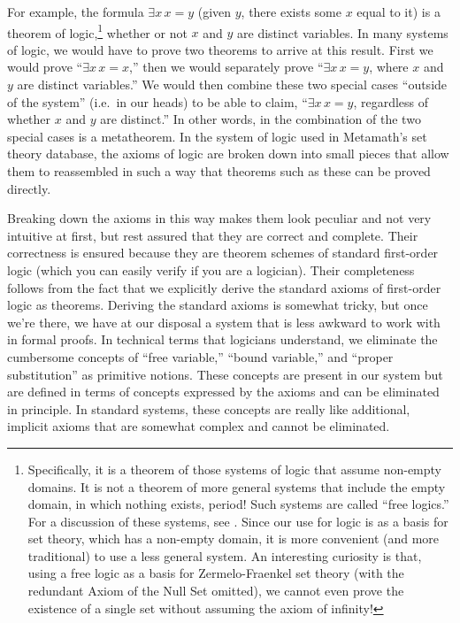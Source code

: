 For example, the formula $\exists x \, x = y $ (given $y$, there exists some
$x$ equal to it) is a theorem of logic,\footnote{Specifically, it is a theorem
of those systems of logic that assume non-empty domains.  It is not a theorem
of more general systems that include the empty domain, in
which nothing exists, period!  Such systems are called ``free
logics.'' For a discussion of these systems, see
\cite{Leblanc}.  Since our use for logic is as a basis
for set theory, which has a non-empty domain, it is more convenient (and more
traditional) to use a less general system.  An interesting curiosity is that,
using a free logic as a basis for Zermelo-Fraenkel set
theory (with the redundant Axiom of the
Null Set omitted), we cannot even prove the
existence of a single set without assuming the axiom of infinity!} whether or not $x$ and $y$ are distinct variables.  In many systems of logic, we would have to prove two theorems to
arrive at this result.  First we would prove ``$\exists x \, x = x $,'' then
we would separately prove ``$\exists x \, x = y $, where $x$ and $y$ are
distinct variables.''  We would then combine these two special cases ``outside
of the system'' (i.e.\ in our heads) to be able to claim, ``$\exists x \, x =
y $, regardless of whether $x$ and $y$ are distinct.''  In other words, in the
combination of the two special cases is a
metatheorem.  In the system of logic
used in Metamath's set theory
database, the axioms of logic are broken down into small pieces that allow
them to reassembled in such a way that theorems such as these can be proved
directly.

Breaking down the axioms in this way makes them look peculiar and not very
intuitive at first, but rest assured that they are correct and complete.  Their
correctness is ensured because they are theorem schemes of standard first-order
logic (which you can easily verify if you are a logician).  Their completeness
follows from the fact that we explicitly derive the standard axioms of
first-order logic as theorems.  Deriving the standard axioms is somewhat
tricky, but once we're there, we have at our disposal a system that is less
awkward to work with in formal proofs.  In technical terms
that logicians understand, we eliminate the cumbersome concepts of ``free
variable,'' ``bound variable,'' and
``proper substitution''
as primitive notions.  These concepts are present in our system but are
defined in terms of concepts expressed by the axioms and can be eliminated in
principle.  In standard systems, these concepts are really like additional,
implicit axioms that are somewhat complex and cannot be
eliminated.

